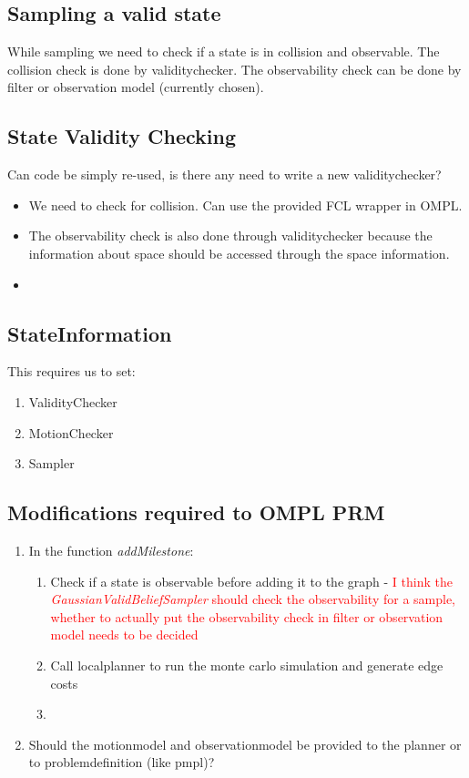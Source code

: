 \subsection{Sampling a valid state}
While sampling we need to check if a state is in collision and observable. The collision check is done by validitychecker. 
The observability check can be done by filter or observation model (currently chosen).

\subsection{State Validity Checking}
Can code be simply re-used, is there any need to write a new validitychecker? 

\begin{itemize}
 \item We need to check for collision. Can use the provided FCL wrapper in OMPL.
 \item The observability check is also done through validitychecker because the information about space should be accessed through the space information.
 \item 
\end{itemize}

\subsection{StateInformation}

This requires us to set:
\begin{enumerate}
 \item ValidityChecker
 \item MotionChecker
 \item Sampler
\end{enumerate}

\subsection{Modifications required to OMPL PRM}

\begin{enumerate}
 \item In the function \textit{addMilestone}:
  \begin{enumerate}
   \item Check if a state is observable before adding it to the graph - \textcolor{red}{I think the \textit{GaussianValidBeliefSampler} should check the observability for a sample, whether to actually put the observability check in filter or observation model needs to be decided} 
   \item Call localplanner to run the monte carlo simulation and generate edge costs
   \item 
  \end{enumerate}

  \item Should the motionmodel and observationmodel be provided to the planner or to problemdefinition (like pmpl)?
\end{enumerate}


